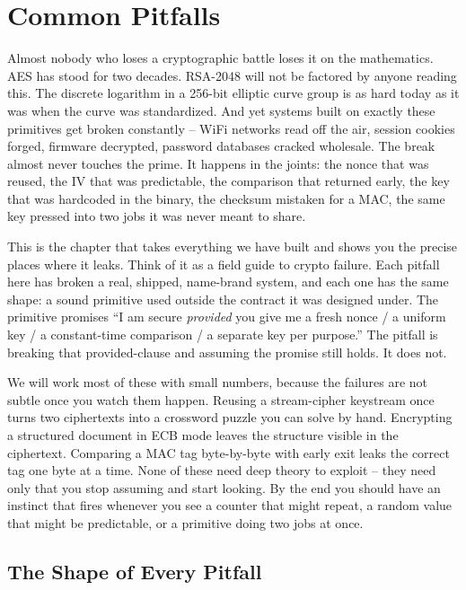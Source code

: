 \chapter{Common Pitfalls}

Almost nobody who loses a cryptographic battle loses it on the mathematics. AES has stood for two decades. RSA-2048 will not be factored by anyone reading this. The discrete logarithm in a 256-bit elliptic curve group is as hard today as it was when the curve was standardized. And yet systems built on exactly these primitives get broken constantly -- WiFi networks read off the air, session cookies forged, firmware decrypted, password databases cracked wholesale. The break almost never touches the prime. It happens in the joints: the nonce that was reused, the IV that was predictable, the comparison that returned early, the key that was hardcoded in the binary, the checksum mistaken for a MAC, the same key pressed into two jobs it was never meant to share.

This is the chapter that takes everything we have built and shows you the precise places where it leaks. Think of it as a field guide to crypto failure. Each pitfall here has broken a real, shipped, name-brand system, and each one has the same shape: a sound primitive used outside the contract it was designed under. The primitive promises ``I am secure \emph{provided} you give me a fresh nonce / a uniform key / a constant-time comparison / a separate key per purpose.'' The pitfall is breaking that provided-clause and assuming the promise still holds. It does not.

We will work most of these with small numbers, because the failures are not subtle once you watch them happen. Reusing a stream-cipher keystream once turns two ciphertexts into a crossword puzzle you can solve by hand. Encrypting a structured document in ECB mode leaves the structure visible in the ciphertext. Comparing a MAC tag byte-by-byte with early exit leaks the correct tag one byte at a time. None of these need deep theory to exploit -- they need only that you stop assuming and start looking. By the end you should have an instinct that fires whenever you see a counter that might repeat, a random value that might be predictable, or a primitive doing two jobs at once.

\chapterline

\section{The Shape of Every Pitfall}
\label{ch38:shape}

